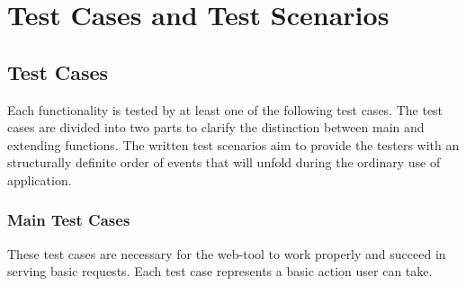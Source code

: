 \section{Test Cases and Test Scenarios}
\subsection{Test Cases}
Each functionality is tested by at least one of the following test cases. The test cases are divided into two parts to clarify the distinction between main and extending functions. The written test scenarios aim to provide the testers with an structurally definite order of events that will unfold during the ordinary use of application. 
\subsubsection{Main Test Cases}
These test cases are necessary for the web-tool to work properly and succeed in serving
basic requests. Each test case represents a basic action user can take.

